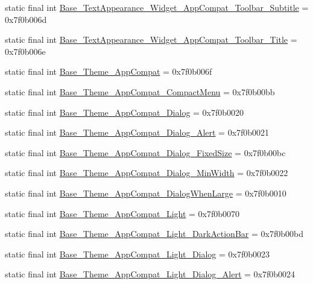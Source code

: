 \begin{CompactItemize}
static final int \hyperlink{classandroid_1_1support_1_1v4_1_1_r_1_1style_dfcf3aacbac8e11f7567f18d6900ab0f}{Base\_\-TextAppearance\_\-Widget\_\-AppCompat\_\-Toolbar\_\-Subtitle} = 0x7f0b006d
\item 
static final int \hyperlink{classandroid_1_1support_1_1v4_1_1_r_1_1style_fc81357a270e45c30d9baa7a1f2ef5dc}{Base\_\-TextAppearance\_\-Widget\_\-AppCompat\_\-Toolbar\_\-Title} = 0x7f0b006e
\item 
static final int \hyperlink{classandroid_1_1support_1_1v4_1_1_r_1_1style_02247ff99bec308d08c22a0b5ae2b143}{Base\_\-Theme\_\-AppCompat} = 0x7f0b006f
\item 
static final int \hyperlink{classandroid_1_1support_1_1v4_1_1_r_1_1style_78992650fc6715cf5d9750f7996576a1}{Base\_\-Theme\_\-AppCompat\_\-CompactMenu} = 0x7f0b00bb
\item 
static final int \hyperlink{classandroid_1_1support_1_1v4_1_1_r_1_1style_87536e27ff0208fb0fe7e9830c29edcf}{Base\_\-Theme\_\-AppCompat\_\-Dialog} = 0x7f0b0020
\item 
static final int \hyperlink{classandroid_1_1support_1_1v4_1_1_r_1_1style_8266fbba4a8a4af0ab9c8ae786d0a35d}{Base\_\-Theme\_\-AppCompat\_\-Dialog\_\-Alert} = 0x7f0b0021
\item 
static final int \hyperlink{classandroid_1_1support_1_1v4_1_1_r_1_1style_69a0a9c9692b6be94c1cadabb2ffb2f1}{Base\_\-Theme\_\-AppCompat\_\-Dialog\_\-FixedSize} = 0x7f0b00bc
\item 
static final int \hyperlink{classandroid_1_1support_1_1v4_1_1_r_1_1style_25da76fcedb9076b95a377a62d78c02c}{Base\_\-Theme\_\-AppCompat\_\-Dialog\_\-MinWidth} = 0x7f0b0022
\item 
static final int \hyperlink{classandroid_1_1support_1_1v4_1_1_r_1_1style_05114d45d0a0fcda822ffe97fb3fb37e}{Base\_\-Theme\_\-AppCompat\_\-DialogWhenLarge} = 0x7f0b0010
\item 
static final int \hyperlink{classandroid_1_1support_1_1v4_1_1_r_1_1style_73c6969ea87c0e5f7374e71e35edd79e}{Base\_\-Theme\_\-AppCompat\_\-Light} = 0x7f0b0070
\item 
static final int \hyperlink{classandroid_1_1support_1_1v4_1_1_r_1_1style_914d5e592a80e0c67c6428bed89c2e5a}{Base\_\-Theme\_\-AppCompat\_\-Light\_\-DarkActionBar} = 0x7f0b00bd
\item 
static final int \hyperlink{classandroid_1_1support_1_1v4_1_1_r_1_1style_0fc03da10af85792d00472ad7c2b242b}{Base\_\-Theme\_\-AppCompat\_\-Light\_\-Dialog} = 0x7f0b0023
\item 
static final int \hyperlink{classandroid_1_1support_1_1v4_1_1_r_1_1style_7234907abf52885e9b0ad94f911cfec0}{Base\_\-Theme\_\-AppCompat\_\-Light\_\-Dialog\_\-Alert} = 0x7f0b0024

\end{CompactItemize}
